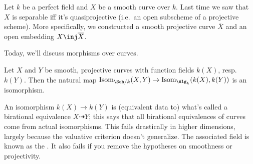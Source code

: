 \label{morecurves}
Let $k$ be a perfect field and $X$ be a smooth curve over $k$. Last time we saw that $X$ is separable iff it's
quasiprojective (i.e.\ an open subscheme of a projective scheme). More specifically, we constructed a smooth
projective curve $\overline X$ and an open embedding $X\inj\overline X$.

Today, we'll discuss morphisms over curves.
\begin{prop}
\label{curvesarefield}
Let $X$ and $Y$ be smooth, projective curves with function fields $k(X)$, resp.\ $k(Y)$. Then the natural map
$\mathrm{Isom}_{\Sch/k}(X,Y)\to \mathrm{Isom}_{\Alg_k}(k(X), k(Y))$ is an isomorphism.
\end{prop}
An isomorphism $k(X)\to k(Y)$ is (equivalent data to) what's called a birational equivalence $X\dashrightarrow Y$;
this says that all birational equivalences of curves come from actual isomorphisms. This fails drastically in
higher dimensions, largely because the valuative criterion doesn't generalize. The associated field is known as the
. It also fails if you remove the hypotheses on smoothness or projectivity.

